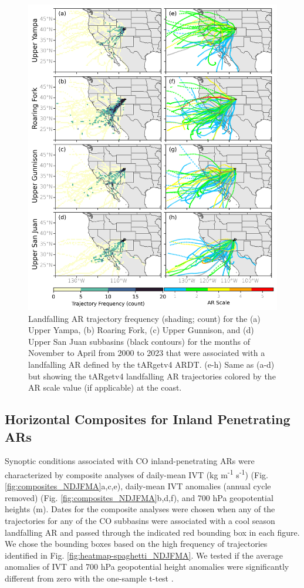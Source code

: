 \documentclass[draft]{agujournal2019}
\begin{document}
\begin{figure}
\noindent\includegraphics[width=\textwidth, height=\textheight, keepaspectratio]{fig4.png}
\caption{Landfalling AR trajectory frequency (shading; count) for the (a) Upper Yampa, (b) Roaring Fork, (c) Upper Gunnison, and (d) Upper San Juan subbasins (black contours) for the months of November to April from 2000 to 2023 that were associated with a landfalling AR defined by the tARgetv4 ARDT. (e-h) Same as (a-d) but showing the tARgetv4 landfalling AR trajectories colored by the AR scale value (if applicable) at the coast.}
\label{fig:individual_subbasins}
\end{figure}

\subsection{Horizontal Composites for Inland Penetrating ARs}
\label{sec:results:composite_analysis}

Synoptic conditions associated with CO inland-penetrating ARs were characterized by composite analyses of daily-mean IVT (kg m\textsuperscript{-1} s\textsuperscript{-1}) (Fig. \ref{fig:composites_NDJFMA}a,c,e), daily-mean IVT anomalies (annual cycle removed) (Fig. \ref{fig:composites_NDJFMA}b,d,f), and 700 hPa geopotential heights (m). Dates for the composite analyses were chosen when any of the trajectories for any of the CO subbasins were associated with a cool season landfalling AR and passed through the indicated red bounding box in each figure. We chose the bounding boxes based on the high frequency of trajectories identified in Fig. \ref{fig:heatmap-spaghetti_NDJFMA}. We tested if the average anomalies of IVT and 700 hPa geopotential height anomalies were significantly different from zero with the one-sample t-test \cite{WILKS2019ch5statistics}. 
\end{document}
